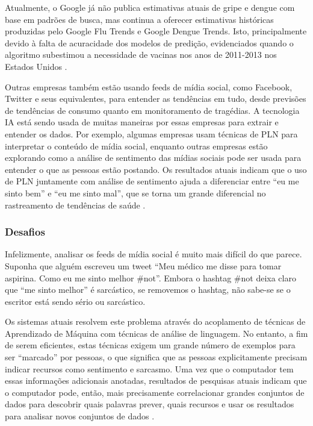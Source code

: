 \documentclass[
	12pt,				%
	openright,			%
	oneside,			%
	a4paper,			%
	english,			%
	spanish,			%
	brazil				%
	]{abntex2}
\begin{document}
Atualmente, o Google já não publica estimativas atuais de gripe e dengue com base em padrões de busca, mas continua a oferecer estimativas históricas produzidas pelo Google Flu Trends e Google Dengue Trends. Isto, principalmente devido à falta de acuracidade dos modelos de predição, evidenciados quando o algoritmo subestimou a necessidade de vacinas nos anos de 2011-2013 nos Estados Unidos  \cite{article_google_flu}.

Outras empresas também estão usando feeds de mídia social, como Facebook, Twitter e seus equivalentes, para entender as tendências em tudo, desde previsões de tendências de consumo quanto em monitoramento de tragédias. A tecnologia \gls{IA} está sendo usada de muitas maneiras por essas empresas para extrair e entender os dados. Por exemplo, algumas empresas usam técnicas de \gls{PLN} para interpretar o conteúdo de mídia social, enquanto outras empresas estão explorando como a análise de sentimento das mídias sociais pode ser usada para entender o que as pessoas estão postando. Os resultados atuais indicam que o uso de \gls{PLN} juntamente com análise de sentimento ajuda a diferenciar entre ``eu me sinto bem'' e ``eu me sinto mal'', que se torna um grande diferencial no rastreamento de tendências de saúde \cite{book_social_machines}.
	
	\subsubsection*{Desafios}
Infelizmente, analisar os feeds de mídia social é muito mais difícil do que parece. Suponha que alguém escreveu um tweet ``Meu médico me disse para tomar aspirina. Como eu me sinto melhor \#not''. Embora o hashtag \#not deixa claro que ``me sinto melhor'' é sarcástico, se removemos o hashtag, não sabe-se se o escritor está sendo sério ou sarcástico.

Os sistemas atuais resolvem este problema através do acoplamento de técnicas de Aprendizado de Máquina com técnicas de análise de linguagem. No entanto, a fim de serem eficientes, estas técnicas exigem um grande número de exemplos para ser ``marcado'' por pessoas, o que significa que as pessoas explicitamente precisam indicar recursos como sentimento e sarcasmo. Uma vez que o computador tem essas informações adicionais anotadas, resultados de pesquisas atuais indicam que o computador pode, então, mais precisamente correlacionar grandes conjuntos de dados para descobrir quais palavras prever, quais recursos  e usar os resultados para analisar novos conjuntos de dados \cite{book_social_machines}.
\end{document}
